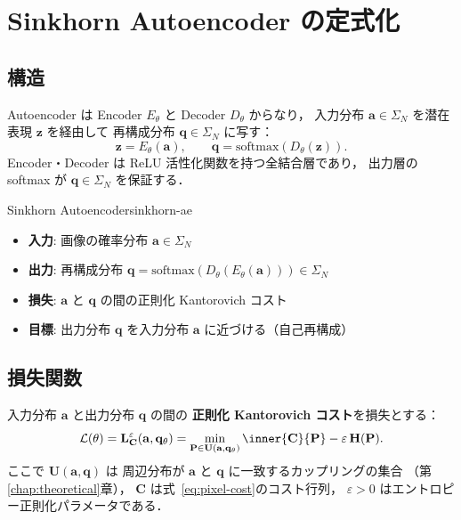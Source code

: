 \section{Sinkhorn Autoencoder の定式化}\label{sec:sinkhorn-ae}

\subsection{構造}

Autoencoder は Encoder $E_\theta$ と Decoder $D_\theta$ からなり，
入力分布 $\mathbf{a} \in \Sigma_N$ を潜在表現 $\mathbf{z}$ を経由して
再構成分布 $\mathbf{q} \in \Sigma_N$ に写す：
\[
  \mathbf{z} = E_\theta(\mathbf{a}),
  \qquad
  \mathbf{q} = \mathrm{softmax}(D_\theta(\mathbf{z})).
\]
Encoder・Decoder は ReLU 活性化関数を持つ全結合層であり，
出力層の softmax が $\mathbf{q} \in \Sigma_N$ を保証する．

\begin{setting}{Sinkhorn Autoencoder}{sinkhorn-ae}
\begin{itemize}
  \item \textbf{入力}: 画像の確率分布 $\mathbf{a} \in \Sigma_N$
  \item \textbf{出力}: 再構成分布 $\mathbf{q} = \mathrm{softmax}(D_\theta(E_\theta(\mathbf{a}))) \in \Sigma_N$
  \item \textbf{損失}: $\mathbf{a}$ と $\mathbf{q}$ の間の正則化 Kantorovich コスト
  \item \textbf{目標}: 出力分布 $\mathbf{q}$ を入力分布 $\mathbf{a}$ に近づける（自己再構成）
\end{itemize}
\end{setting}

\subsection{損失関数}\label{subsec:loss}

入力分布 $\mathbf{a}$ と出力分布 $\mathbf{q}$ の間の
\textbf{正則化 Kantorovich コスト}を損失とする：
\begin{equation}\label{eq:ae-loss}
  \mathcal{L}(\theta)
  = \mathbf{L}^\varepsilon_{\mathbf{C}}(\mathbf{a}, \mathbf{q}_\theta)
  = \min_{\mathbf{P} \in \mathbf{U}(\mathbf{a}, \mathbf{q}_\theta)}
    \inner{\mathbf{C}}{\mathbf{P}} - \varepsilon\, \mathbf{H}(\mathbf{P}).
\end{equation}
ここで $\mathbf{U}(\mathbf{a}, \mathbf{q})$ は
周辺分布が $\mathbf{a}$ と $\mathbf{q}$ に一致するカップリングの集合
（第\ref{chap:theoretical}章），
$\mathbf{C}$ は式~\eqref{eq:pixel-cost}のコスト行列，
$\varepsilon > 0$ はエントロピー正則化パラメータである．


